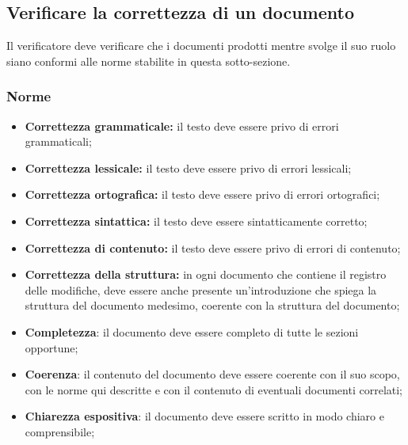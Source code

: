 \subsection{Verificare la correttezza di un documento}
\label{verifica-documento}

Il verificatore deve verificare che i documenti prodotti mentre svolge il suo
ruolo siano conformi alle norme stabilite in questa sotto-sezione.

\subsubsection{Norme}
\begin{itemize}
	\item \textbf{Correttezza grammaticale:} il testo deve essere privo di
	      errori grammaticali;

	\item \textbf{Correttezza lessicale:} il testo deve essere privo di errori
	      lessicali;

	\item \textbf{Correttezza ortografica:} il testo deve essere privo di errori
	      ortografici;

	\item \textbf{Correttezza sintattica:} il testo deve essere sintatticamente
	      corretto;

	\item \textbf{Correttezza di contenuto:} il testo deve essere privo di
	      errori di contenuto;

	\item \textbf{Correttezza della struttura:} in ogni documento che contiene
	      il registro delle modifiche, deve essere anche presente
	      un'introduzione che spiega la struttura del documento medesimo,
	      coerente con la struttura del documento;

	\item \textbf{Completezza}: il documento deve essere completo di tutte le
	      sezioni opportune;

	\item \textbf{Coerenza}: il contenuto del documento deve essere
	      coerente con il suo scopo, con le norme qui descritte e con il
	      contenuto di eventuali documenti correlati;

	\item \textbf{Chiarezza espositiva}: il documento deve essere
	      scritto in modo chiaro e comprensibile;
\end{itemize}

